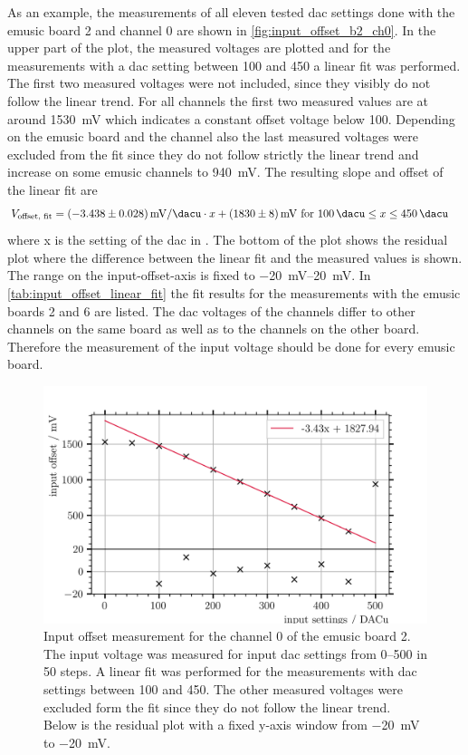 As an example, the measurements of all eleven tested \ac{dac} settings done with the \ac{emusic} board 2 and channel 0 are shown in \autoref{fig:input_offset_b2_ch0}.
In the upper part of the plot, the measured voltages are plotted and for the measurements with a \ac{dac} setting between \SI{100}{\dacu} and \SI{450}{\dacu} a linear fit was performed.
The first two measured voltages were not included, since they visibly do not follow the linear trend.
For all channels the first two measured values are at around \SI{1530}{\milli\volt} which indicates a constant offset voltage below \SI{100}{\adcu}.
Depending on the \ac{emusic} board and the channel also the last measured voltages were excluded from the fit since they do not follow strictly the linear trend and increase on some \ac{emusic} channels to \SI{940}{\milli\volt}.
The resulting slope and offset of the linear fit are
\begin{align}
	V_\text{offset, fit} &= \SI{-3.438(28)}{\milli\volt\per\dacu}\cdot x+\SI{1830(8)}{\milli\volt}\text{ for }\SI{100}{\dacu}\leq x\leq\SI{450}{\dacu}
\end{align}
where x is the setting of the \ac{dac} in \si{\dacu}.
The bottom of the plot shows the residual plot where the difference between the linear fit and the measured values is shown.
The range on the input-offset-axis is fixed to \SIrange{-20}{20}{\milli\volt}.
In \autoref{tab:input_offset_linear_fit} the fit results for the measurements with the \ac{emusic} boards 2 and 6 are listed.
The \ac{dac} voltages of the channels differ to other channels on the same board as well as to the channels on the other board.
Therefore the measurement of the input voltage should be done for every \ac{emusic} board.
\begin{figure}
	\centering
	\includegraphics[width=1.\textwidth]{pictures/input_offset_board_2_channel_0}
	\caption[Input offset measurement for eMUSIC board 2 channel 1]{Input offset measurement for the channel 0 of the \ac{emusic} board 2. The input voltage was measured for input \ac{dac} settings from \SIrange{0}{500}{\dacu} in \SI{50}{\dacu} steps. A linear fit was performed for the measurements with \ac{dac} settings between \SI{100}{\dacu} and \SI{450}{\dacu}. The other measured voltages were excluded form the fit since they do not follow the linear trend. Below is the residual plot with a fixed y-axis window from \SI{-20}{\milli\volt} to \SI{-20}{\milli\volt}.}
	\label{fig:input_offset_b2_ch0}
\end{figure}
